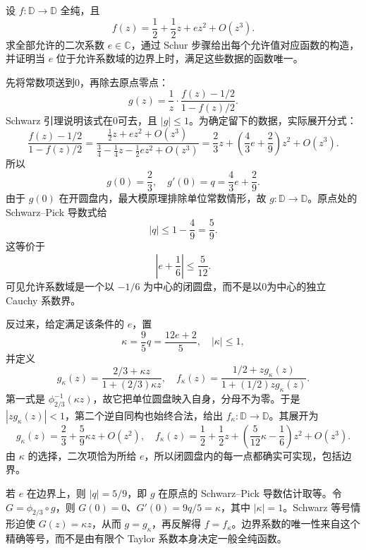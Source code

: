 \begin{exercise}\label{b3:ex:06-3}
设 \(f:\mathbb D\rightarrow\mathbb D\) 全纯，且
\[
 f(z)=\frac12+\frac12z+ez^2+O(z^3).
\]
求全部允许的二次系数 \(e\in\mathbb C\)，通过 Schur 步骤给出每个允许值对应函数的构造，并证明当 \(e\) 位于允许系数域的边界上时，满足这些数据的函数唯一。
\end{exercise}
\begin{solution}
先将常数项送到0，再除去原点零点：
\[
 g(z)=\frac1z\cdot\frac{f(z)-1/2}{1-f(z)/2}.
\]
Schwarz 引理说明该式在0可去，且 \(|g|\le1\)。为确定留下的数据，实际展开分式：
\[
 \frac{f(z)-1/2}{1-f(z)/2}
 =\frac{\frac12z+ez^2+O(z^3)}
        {\frac34-\frac14z-\frac12ez^2+O(z^3)}
 =\frac23z+\left(\frac43e+\frac29\right)z^2+O(z^3).
\]
所以
\[
 g(0)=\frac23,\quad g'(0)=q=\frac43e+\frac29.
\]
由于 \(g(0)\) 在开圆盘内，最大模原理排除单位常数情形，故 \(g:\mathbb D\to\mathbb D\)。原点处的 Schwarz--Pick 导数式给
\[
 |q|\le1-\frac49=\frac59.
\]
这等价于
\[
 \left|e+\frac16\right|\le\frac5{12}.
\]
可见允许系数域是一个以 \(-1/6\) 为中心的闭圆盘，而不是以0为中心的独立 Cauchy 系数界。

反过来，给定满足该条件的 \(e\)，置
\[
 \kappa=\frac95q=\frac{12e+2}{5},\quad |\kappa|\le1,
\]
并定义
\[
 g_\kappa(z)=\frac{2/3+\kappa z}{1+(2/3)\kappa z},
 \quad
 f_\kappa(z)=\frac{1/2+zg_\kappa(z)}{1+(1/2)zg_\kappa(z)}.
\]
第一式是 \(\phi_{2/3}^{-1}(\kappa z)\)，故它把单位圆盘映入自身，分母不为零。于是 \(|zg_\kappa(z)|<1\)，第二个逆自同构也始终合法，给出 \(f_\kappa:\mathbb D\to\mathbb D\)。其展开为
\[
 g_\kappa(z)=\frac23+\frac59\kappa z+O(z^2),
 \quad
 f_\kappa(z)=\frac12+\frac12z+
 \left(\frac5{12}\kappa-\frac16\right)z^2+O(z^3).
\]
由 \(\kappa\) 的选择，二次项恰为所给 \(e\)，所以闭圆盘内的每一点都确实可实现，包括边界。

若 \(e\) 在边界上，则 \(|q|=5/9\)，即 \(g\) 在原点的 Schwarz--Pick 导数估计取等。令 \(G=\phi_{2/3}\circ g\)，则 \(G(0)=0\)、\(G'(0)=9q/5=\kappa\)，其中 \(|\kappa|=1\)。Schwarz 等号情形迫使 \(G(z)=\kappa z\)，从而 \(g=g_\kappa\)，再反解得 \(f=f_\kappa\)。边界系数的唯一性来自这个精确等号，而不是由有限个 Taylor 系数本身决定一般全纯函数。
\end{solution}

